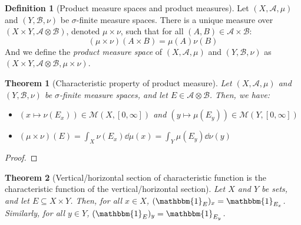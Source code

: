 \documentclass{article}
\newtheorem{theorem}{Theorem}[section]
\theoremstyle{definition}
\newtheorem{definition}{Definition}[section]
\theoremstyle{remark}
\theoremstyle{example}
\theoremstyle{notation}
\begin{document}
\begin{definition}[Product measure spaces and product measures] %
		Let $(X, \mathcal{A}, \mu)$ and $(Y, \mathcal{B}, \nu)$ be $\sigma$-finite measure spaces. There is a unique measure over $(X \times Y, \mathcal{A} \otimes \mathcal{B})$, denoted $\mu \times \nu$, such that for all $(A, B) \in \mathcal{A} \times \mathcal{B}$:
				$$(\mu \times \nu)(A \times B) = \mu(A)\nu(B)$$
		And we define the \textit{product measure space} of $(X, \mathcal{A}, \mu)$ and $(Y, \mathcal{B}, \nu)$ as $(X \times Y, \mathcal{A} \otimes \mathcal{B}, \mu \times \nu)$.
\end{definition}


\begin{theorem}[Characteristic property of product measure] \label{thm:product-measure-charac} %
		Let $(X, \mathcal{A}, \mu)$ and $(Y, \mathcal{B}, \nu)$ be $\sigma$-finite measure spaces, and let $E \in \mathcal{A} \otimes \mathcal{B}$. Then, we have:
		\begin{itemize}
				\item $(x \mapsto \nu(E_x)) \in \mathcal{M}(X, [0, \infty])$ and $(y \mapsto \mu(E_y)) \in \mathcal{M}(Y, [0, \infty])$
				\item $(\mu \times \nu)(E) = \int_X \nu(E_x) \dd \mu(x) = \int_Y \mu(E_y) \dd \nu(y)$
		\end{itemize}
\end{theorem}

\begin{proof}
\end{proof}

\begin{theorem}[Vertical/horizontal section of characteristic function is the characteristic function of the vertical/horizontal section] \label{thm:section-charac-charac-section}%
		Let $X$ and $Y$ be sets, and let $E \subseteq X \times Y$. Then, for all $x \in X$, $(\mathbbm{1}_E)_x = \mathbbm{1}_{E_x}$. Similarly, for all $y \in Y$, $(\mathbbm{1}_E)_y = \mathbbm{1}_{E_y}$.
\end{theorem}
\end{document}
